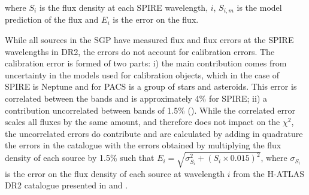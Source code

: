 where $S_i$ is the flux density at each SPIRE wavelength, $i$, $S_{i,m}$ is the model prediction of the flux and $E_i$ is the error on the flux. 

While all sources in the SGP have measured flux and flux errors at the SPIRE wavelengths in DR2, the errors do not account for calibration errors. The calibration error is formed of two parts: i) the main contribution comes from uncertainty in the models used for calibration objects, which in the case of SPIRE is Neptune and for PACS is a group of stars and asteroids. This error is correlated between the bands and is approximately 4\% for SPIRE; ii) a contribution uncorrelated between bands of 1.5\% (\citealt{Valiante_2016}). While the correlated error scales all fluxes by the same amount, and therefore does not impact on the $\chi^2$, the uncorrelated errors do contribute and are calculated by adding in quadrature the errors in the catalogue with the errors obtained by multiplying the flux density of each source by 1.5\% such that $E_i = \sqrt{\sigma_{S_i}^2 + (S_i \times 0.015)^2}$, where $\sigma_{S_i}$ is the error on the flux density of each source at wavelength $i$ from the H-ATLAS DR2 catalogue presented in \citealt{Valiante_2016} and \citealt{Maddox_2018}.

